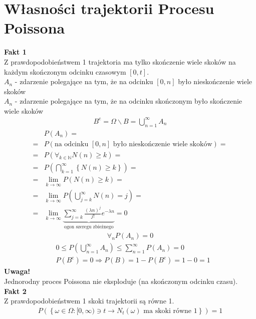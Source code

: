 \section{Własności trajektorii Procesu Poissona}
\textbf{Fakt 1}\\
Z prawdopodobieństwem 1 trajektoria ma tylko skończenie wiele skoków na każdym skończonym odcinku czasowym $ [0,t] $.\\
$ A_n $ - zdarzenie polegające na tym, że na odcinku $ [0,n] $ było nieskończenie wiele skoków\\
$ A_n $ - zdarzenie polegające na tym, że na odcinku skończonym było skończenie wiele skoków
\begin{gather*}
B^\mathrm c=\Omega\backslash B=\bigcup_{n=1}^\infty A_n
\end{gather*}
\begin{align*}
&P\left(A_n\right)
=\\=&
P\left(\text{na odcinku }[0,n]\text{ było nieskończenie wiele skoków}\right)
=\\=&
P\left(\forall_{k\in \mathbb N }N(n)\ge k\right)
=\\=&
P\left(\bigcap_{k=1}^\infty \left\{N(n)\ge k\right\}\right)
=\\=&
\lim\limits_{k\to\infty} P\left(N(n)\ge k\right)
=\\=&
\lim\limits_{k\to\infty} P\left(\bigcup_{j=k}^\infty N(n)=j\right)
=\\=&
\lim\limits_{k\to\infty} \underbrace{\sum_{j=k}^\infty \frac{(\lambda n)^j}{j!}e^{-\lambda n}}_{\text{ogon szeregu zbieżnego}}=0
\end{align*}
\begin{gather*}
\forall_nP\left(A_n\right)=0
\end{gather*}
\begin{align*}
&0\le P\left(\bigcup_{n=1}^\infty A_n\right)\le \sum_{n=1}^{\infty }P\left(A_n\right)=0\\
&P\left(B^\mathrm c\right)=0\Rightarrow P\left(B\right)=1-P\left(B^\mathrm c\right)=1-0=1
\end{align*}
\textbf{Uwaga!}\\
Jednorodny proces Poissona nie eksploduje (na skończonym odcinku czasu).\\
\textbf{Fakt 2}\\
Z prawdopodobieństwem 1 skoki trajektorii są równe 1.
\begin{gather*}
P\left(\left\{\omega\in\Omega:[0,\infty )\ni t\to N_t(\omega)\text{ ma skoki równe }1\right\}\right)=1
\end{gather*}
